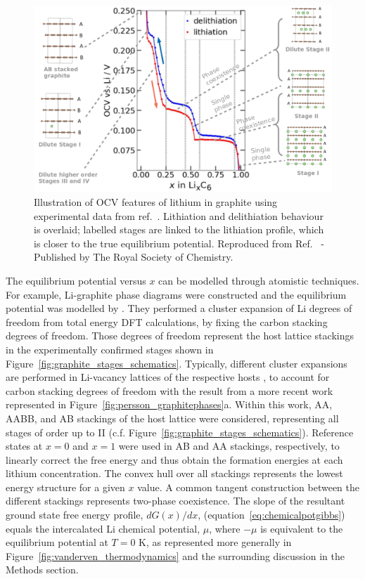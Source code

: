 \documentclass[../main.tex]{subfiles}
\begin{document}
\begin{figure}
    \centering
    \includegraphics[scale=1.2]{figures/ocv_and_stages.png}
    \caption{Illustration of OCV features of lithium in graphite using experimental data from ref.~. Lithiation and delithiation behaviour is overlaid; labelled stages are linked to the lithiation profile, which is closer to the true equilibrium potential. Reproduced from Ref.~ - Published by The Royal Society of Chemistry.}
    \label{fig:expt_ocv}
\end{figure}

The equilibrium potential versus $x$ can be modelled through atomistic techniques. For example, Li-graphite phase diagrams were constructed and the equilibrium potential was modelled by \citeauthor{persson2010} \cite{persson2010}. They performed a cluster expansion of Li degrees of freedom from total energy DFT calculations, by fixing the carbon stacking degrees of freedom. Those degrees of freedom represent the host lattice stackings in the experimentally confirmed stages shown in Figure~\ref{fig:graphite_stages_schematics}. Typically, different cluster expansions are performed in Li-vacancy lattices of the respective hosts \cite{persson2010,hazrati_li_2014,Mercer2021}, to account for carbon stacking degrees of freedom with the result from a more recent work \cite{Mercer2021} represented in Figure~\ref{fig:persson_graphitephases}a. Within this work, AA, AABB, and AB stackings of the host lattice were considered, representing all stages of order up to II (c.f. Figure~\ref{fig:graphite_stages_schematics}). Reference states at $x=0$ and $x=1$ were used in AB and AA stackings, respectively, to linearly correct the free energy and thus obtain the formation energies at each lithium concentration. The convex hull over all stackings represents the lowest energy structure for a given $x$ value. A common tangent construction between the different stackings represents two-phase coexistence. The slope of the resultant ground state free energy profile, $dG(x)/dx$, (equation~\ref{eq:chemicalpotgibbs}) equals the intercalated Li chemical potential, $\mu$, where $-\mu$ is equivalent to the equilibrium potential at $T = 0$ K, as represented more generally in Figure~\ref{fig:vanderven_thermodynamics} and the surrounding discussion in the Methods section.
\end{document}

